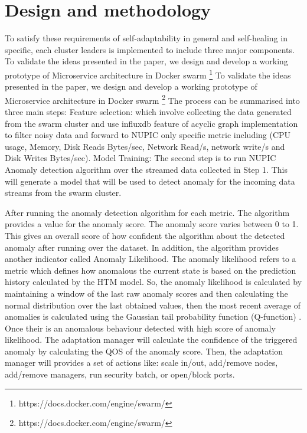 \documentclass[sigconf]{acmart}
\begin{document}
\section{Design and methodology}
\label{sec:modelling}



To satisfy these requirements of self-adaptability in general and self-healing in specific, each cluster leaders is implemented to include three major components. To validate the ideas presented in the paper, we design and develop a working prototype of Microservice architecture in Docker swarm \footnote{https://docs.docker.com/engine/swarm/} 
To validate the ideas presented in the paper, we design and develop a working prototype of Microservice architecture in Docker swarm \footnote{https://docs.docker.com/engine/swarm/} 
The process can be summarised into three main steps: 
Feature selection: which involve collecting the data generated from the swarm cluster and use influxdb feature of acyclic graph implementation to filter noisy data and forward to NUPIC only specific metric including (CPU usage, Memory, Disk Reads Bytes/sec, Network Read/s, network write/s and Disk Writes Bytes/sec). 
Model Training: The second step is to run NUPIC Anomaly detection algorithm over the streamed data collected in Step 1. This will generate a model that will be used to detect anomaly for the incoming data streams from the swarm cluster. 

After running the anomaly detection algorithm for each metric. The algorithm provides a value for the anomaly score. The anomaly score varies between 0 to 1. This gives an overall score of how confident the algorithm about the detected anomaly after running over the dataset. In addition, the algorithm provides another indicator called Anomaly Likelihood. The anomaly likelihood refers to a metric which defines how anomalous the current state is based on the prediction history calculated by the HTM model. So, the anomaly likelihood is calculated by maintaining a window of the last raw anomaly scores and then calculating the normal distribution over the last obtained values, then the most recent average of anomalies is calculated using the Gaussian tail probability function (Q-function) \cite{craig1991new}. Once their is an anomalous behaviour detected with high score of anomaly likelihood. The adaptation manager will calculate the confidence of the triggered anomaly by calculating the QOS of the anomaly score. Then, the adaptation manager will provides a set of actions like: scale in/out, add/remove nodes, add/remove managers, run security batch, or open/block ports.  
\end{document}
